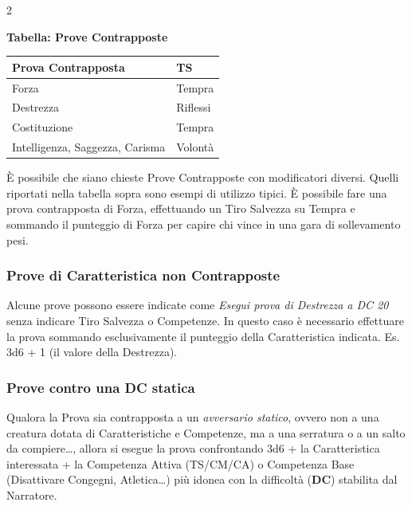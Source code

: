 \begin{multicols}{2}
\smallskip

\textbf{Tabella: Prove Contrapposte}\label{Tabella Prove Contrapposte e Caratteristiche}

\smallskip

\noindent\begin{tabularx}{\linewidth}{Xl}
\toprule
\rowcolor{gray!20}\textbf{Prova Contrapposta}& \textbf{TS} \\
\toprule
Forza& Tempra \\
\rowcolor{gray!20}Destrezza&Riflessi\\
Costituzione& Tempra\\
\rowcolor{gray!20}Intelligenza, Saggezza, Carisma& Volontà
\end{tabularx}

\smallskip

È possibile che siano chieste Prove Contrapposte con modificatori diversi. Quelli riportati nella tabella sopra sono esempi di utilizzo tipici. È possibile fare una prova contrapposta di Forza, effettuando un Tiro Salvezza su Tempra e sommando il punteggio di Forza per capire chi vince in una gara di sollevamento pesi.

\subsubsection{Prove di Caratteristica non Contrapposte}

Alcune prove possono essere indicate come \emph{Esegui prova di Destrezza a DC 20} senza indicare Tiro Salvezza o Competenze. In questo caso è necessario effettuare la prova sommando esclusivamente il punteggio della Caratteristica indicata. Es. 3d6 + 1 (il valore della Destrezza).

\subsubsection{Prove contro una DC statica}

Qualora la Prova sia contrapposta a un \textit{avversario statico}, ovvero non a una creatura dotata di Caratteristiche e Competenze, ma a una serratura o a un salto da compiere…, allora si esegue la prova confrontando 3d6 + la Caratteristica interessata + la Competenza Attiva (TS/CM/CA) o Competenza Base (Disattivare Congegni, Atletica…) più idonea con la difficoltà (\textbf{DC}) stabilita dal Narratore.


\end{multicols}
